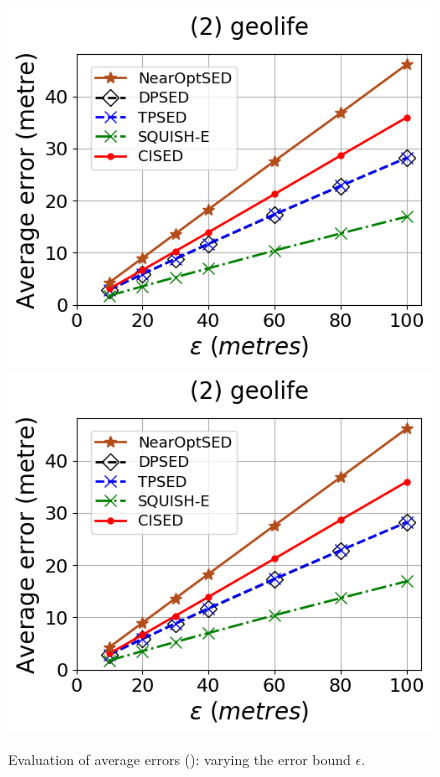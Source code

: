\begin{figure}[tb!]
	\includegraphics[scale=0.315]{Figures/Exp-error-epsilon-geolife.png}	\hspace{1ex}
	\includegraphics[scale=0.315]{Figures/Exp-error-epsilon-geolife.png}
	\vspace{-2ex}
	\caption{\small Evaluation of average errors (\sed): varying the error bound $\epsilon$.}
	\label{fig:ae-sed}
	\vspace{-2ex}
\end{figure}


